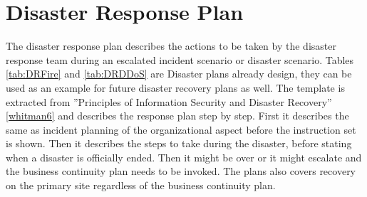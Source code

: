 \section{Disaster Response Plan}
The disaster response plan describes the actions to be taken by the disaster response team during an escalated incident scenario or disaster scenario. Tables \ref{tab:DRFire} and \ref{tab:DRDDoS} are Disaster plans already design, they can be used as an example for future disaster recovery plans as well. The template is extracted from ”Principles of Information Security and Disaster Recovery” \ref{whitman6} and describes the response plan step by step. First it describes the same as incident planning of the organizational aspect before the instruction set is shown. Then it describes the steps to take during the disaster, before stating when a disaster is officially ended. Then it might be over or it might escalate and the business continuity plan needs to be invoked. The plans also covers recovery on the primary site regardless of the business continuity plan. 
